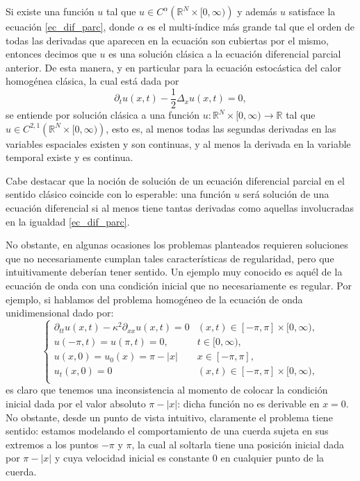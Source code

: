 \documentclass[letterpaper,twoside,12pt]{book}
\newcommand{\R}{\mathbb{R}}
\newcommand{\1}{\mathds{1}}
\newcommand{\abs}[1]{\left\lvert #1 \right\rvert}
\renewcommand{\to}{\rightarrow}
\theoremstyle{definition}
\theoremstyle{definition}
\theoremstyle{definition}
\theoremstyle{definition}
\theoremstyle{definition}
\theoremstyle{definition}
\theoremstyle{definition}
\begin{document}
Si existe una función $u$ tal que $u\in C^{\alpha}\left(\R^{N}\times [0,\infty)\right)$ y además $u$ satisface la ecuación \eqref{ec_dif_parc}, donde $\alpha$ es el multi-índice más grande tal que el orden de todas las derivadas que aparecen en la ecuación son cubiertas por el mismo, entonces decimos que $u$ es una solución clásica a la ecuación diferencial parcial anterior. De esta manera, y en particular para la ecuación estocástica del calor homogénea clásica, la cual está dada por 
\[
    \partial_tu(x,t)-\frac{1}{2}\Delta_x u(x,t)=0,
\]
se entiende por solución clásica a una función $u:\R^{N}\times[0,\infty)\to \R$ tal que $u\in C^{2,1}\left(\R^{N}\times [0,\infty)\right)$, esto es, al menos todas las segundas derivadas en las variables espaciales existen y son continuas, y al menos la derivada en la variable temporal existe y es continua. 

Cabe destacar que la noción de solución de un ecuación diferencial parcial en el sentido clásico coincide con lo esperable: una función $u$ será solución de una ecuación diferencial si al menos tiene tantas derivadas como aquellas involucradas en la igualdad \eqref{ec_dif_parc}.

No obstante, en algunas ocasiones los problemas planteados requieren soluciones que no necesariamente cumplan tales características de regularidad, pero que intuitivamente deberían tener sentido.
 Un ejemplo muy conocido es aquél de la ecuación de onda con una condición inicial que no necesariamente es regular. Por ejemplo, si hablamos del problema homogéneo de la ecuación de onda unidimensional dado por:
\begin{equation}\label{wave_eq_sobolev}
    \begin{cases}
        \partial_{tt}u(x,t)-\kappa^2\partial_{xx}u(x,t)=0 & (x,t)\in [-\pi,\pi]\times[0,\infty),\\
        u(-\pi,t)=u(\pi,t)=0, & t\in [0,\infty),\\
        u(x,0)=u_0(x)=\pi-\abs{x} & x\in [-\pi,\pi],\\
        u_t(x,0)=0 & (x,t) \in [-\pi,\pi]\times[0,\infty),\\
    \end{cases}
\end{equation}
es claro que tenemos una inconsistencia al momento de colocar la condición inicial dada por el valor absoluto $\pi-|x|$: dicha función no es derivable en $x=0$. No obstante, desde un punto de vista intuitivo, claramente el problema tiene sentido: estamos modelando el comportamiento de una cuerda sujeta en sus extremos a los puntos $-\pi$ y $\pi$, la cual al soltarla tiene una posición inicial dada por $\pi-|x|$ y cuya velocidad inicial es constante $0$ en cualquier punto de la cuerda.\newline
\end{document}
